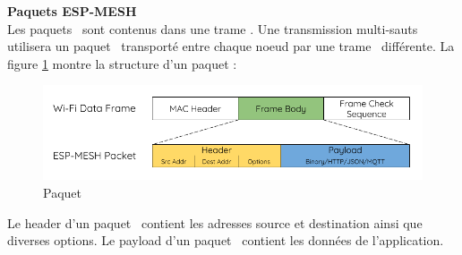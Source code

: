         \textbf{Paquets ESP-MESH}\\
            Les paquets \espmesh\ sont contenus dans une trame \wifi. Une transmission multi-sauts utilisera un paquet \espmesh\ transporté 
            entre chaque noeud par une trame \wifi\ différente.
            La figure \ref{fig_meshPacket} montre la structure d'un paquet \espmesh:\\

            \begin{figure}[h]
                \centering
                \includegraphics[scale=0.5]{images/mesh-packet.png}
                \caption{Paquet \espmesh\ \cite{esp-mesh_w}}
                \label{fig_meshPacket}
            \end{figure}
            Le header d'un paquet \espmesh\ contient les adresses source et destination ainsi que diverses options.
            Le payload d'un paquet \espmesh\ contient les données de l'application.

